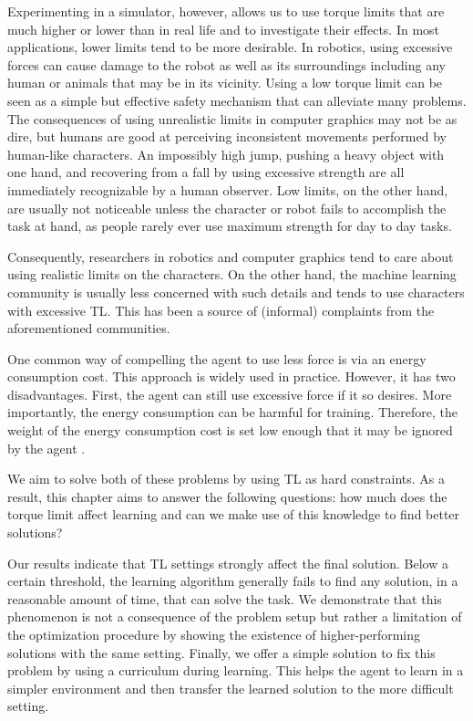 Experimenting in a simulator, however, allows us to use torque limits that are much higher or lower than in real life and to investigate their effects. In most applications, lower limits tend to be more desirable. In robotics, using excessive forces can cause damage to the robot as well as its surroundings including any human or animals that may be in its vicinity. Using a low torque limit can be seen as a simple but effective safety mechanism that can alleviate many problems. The consequences of using unrealistic limits in computer graphics may not be as dire, but humans are good at perceiving inconsistent movements performed by human-like characters. An impossibly high jump, pushing a heavy object with one hand, and recovering from a fall by using excessive strength are all immediately recognizable by a human observer. Low limits, on the other hand, are usually not noticeable unless the character or robot fails to accomplish the task at hand, as people rarely ever use maximum strength for day to day tasks.

Consequently, researchers in robotics and computer graphics tend to care about using realistic limits on the characters. On the other hand, the machine learning community is usually less concerned with such details and tends to use characters with excessive \ac{TL}. This has been a source of (informal) complaints from the aforementioned communities.

One common way of compelling the agent to use less force is via an energy consumption cost. This approach is widely used in practice. However, it has two disadvantages. First, the agent can still use excessive force if it so desires. More importantly, the energy consumption can be harmful for training. Therefore, the weight of the energy consumption cost is set low enough that it may be ignored by the agent \cite{Yu-SIGGRAPH-2018}.

We aim to solve both of these problems by using \ac{TL} as hard constraints. As a result, this chapter aims to answer the following questions: how much does the torque limit affect learning and can we make use of this knowledge to find better solutions?

Our results indicate that \ac{TL} settings strongly affect the final solution. Below a certain threshold, the learning algorithm generally fails to find any solution, in a reasonable amount of time, that can solve the task. We demonstrate that this phenomenon is not a consequence of the problem setup but rather a limitation of the optimization procedure by showing the existence of higher-performing solutions with the same setting. Finally, we offer a simple solution to fix this problem by using a curriculum during learning. This helps the agent to learn in a simpler environment and then transfer the learned solution to the more difficult setting.

